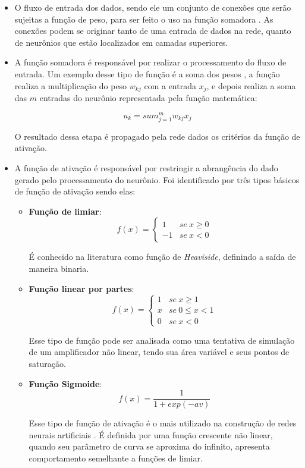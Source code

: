 \begin{itemize}
\item O fluxo de entrada dos dados, sendo ele um conjunto de conexões que serão sujeitas a função de peso, para ser feito o uso na função somadora \cite{haykin2001}. As conexões podem se originar tanto de uma entrada de dados na rede, quanto de neurônios que estão localizados em camadas superiores.
\item A função somadora é responsável por realizar o processamento do fluxo de entrada.
Um exemplo desse tipo de função é a soma dos pesos \cite{Kriesel2007NeuralNetworks}, a função realiza a multiplicação do peso $w_{kj}$ com a entrada $x_j$, e depois realiza a soma das $m$ entradas do neurônio representada pela função matemática:
\par \[u_k = sum_{j=1}^{m} w_{kj}x_j\]
\par O resultado dessa etapa é propagado pela rede dados os critérios da função de ativação.
\item A função de ativação é responsável por restringir a abrangência do dado gerado pelo processamento do neurônio. Foi identificado por  três tipos básicos de função de ativação sendo elas:
  \begin{itemize}
    \item \textbf{Função de limiar}:
\[ f(x)= \begin{cases} 1&se \ x \ge 0 \\ -1 & se\ x < 0 \end{cases} \]
      \par É conhecido na literatura como função de \textit{Heaviside}, definindo a saída de maneira binaria.
    \item \textbf{Função linear por partes}: 
\[ f(x)= \begin{cases} 1&se \ x \ge 1 \\x & se\ 0\le x < 1 \\ 0 & se\ x < 0 \end{cases} \]
      \par Esse tipo de função pode ser analisada como uma tentativa de simulação de um amplificador não linear, tendo sua área variável e seus pontos de saturação. 
    \item \textbf{Função Sigmoide}: 
\[ f(x)= \frac{1}{1 + exp(-av)} \]
      \par Esse tipo de função de ativação é o mais utilizado na construção de redes neurais artificiais \cite{haykin2001}. É definida por uma função crescente não linear, quando seu parâmetro de curva se aproxima do infinito, apresenta comportamento semelhante a funções de limiar.
  \end{itemize}
\end{itemize}
